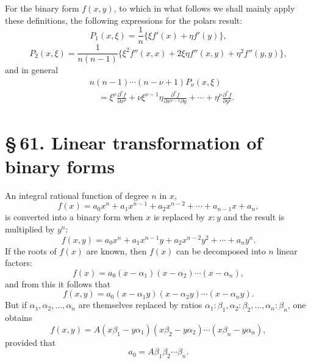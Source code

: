 \documentclass[11pt]{article}
\providecommand{\sect}[2]{\section*{\S\,#1. #2}}
\begin{document}
For the binary form $f(x,y)$, to which in what follows we shall mainly apply these definitions, the following expressions for the polars result:
\[
 P_1(x,\xi)=\frac1n\{\xi f'(x)+\eta f'(y)\},
\]
\[
 P_2(x,\xi)=\frac1{n(n-1)}\{\xi^2f''(x,x)+2\xi\eta f''(x,y)+\eta^2f''(y,y)\},
\]
and in general
\[
\begin{aligned}
&n(n-1)\cdots(n-\nu+1)P_\nu(x,\xi)\\
&\quad=\xi^\nu\frac{\partial^\nu f}{\partial x^\nu}
+\nu\xi^{\nu-1}\eta\frac{\partial^\nu f}{\partial x^{\nu-1}\partial y}
+\cdots+
\eta^\nu\frac{\partial^\nu f}{\partial y^\nu}.
\end{aligned}
\]

\sect{61}{Linear transformation of binary forms}

An integral rational function of degree $n$ in $x$,
\begin{equation}
 f(x)=a_0x^n+a_1x^{n-1}+a_2x^{n-2}+\cdots+a_{n-1}x+a_n,
\tag{1}
\end{equation}
is converted into a binary form when $x$ is replaced by $x:y$ and the result is multiplied by $y^n$:
\begin{equation}
 f(x,y)=a_0x^n+a_1x^{n-1}y+a_2x^{n-2}y^2+\cdots+a_ny^n.
\tag{2}
\end{equation}
If the roots of $f(x)$ are known, then $f(x)$ can be decomposed into $n$ linear factors:
\begin{equation}
 f(x)=a_0(x-\alpha_1)(x-\alpha_2)\cdots(x-\alpha_n),
\tag{3}
\end{equation}
and from this it follows that
\begin{equation}
 f(x,y)=a_0(x-\alpha_1y)(x-\alpha_2y)\cdots(x-\alpha_ny).
\tag{4}
\end{equation}
But if $\alpha_1,\alpha_2,\ldots,\alpha_n$ are themselves replaced by ratios $\alpha_1:\beta_1,\alpha_2:\beta_2,\ldots,\alpha_n:\beta_n$, one obtains
\begin{equation}
 f(x,y)=A(x\beta_1-y\alpha_1)(x\beta_2-y\alpha_2)\cdots(x\beta_n-y\alpha_n),
\tag{5}
\end{equation}
provided that
\[
 a_0=A\beta_1\beta_2\cdots\beta_n.
\]
\end{document}
